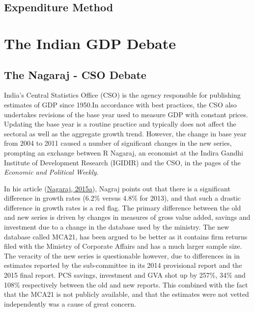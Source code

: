 \documentclass[12pt,nobind, a4paper]{reedthesis}
\begin{document}
 \hypertarget{expenditure-method}{%
 \subsection{Expenditure Method}\label{expenditure-method}}

 \hypertarget{the-indian-gdp-debate}{%
 \section{The Indian GDP Debate}\label{the-indian-gdp-debate}}

 \hypertarget{the-nagaraj---cso-debate}{%
 \subsection{The Nagaraj - CSO Debate}\label{the-nagaraj---cso-debate}}

 India's Central Statistics Office (CSO) is the agency responsible for publishing estimates of GDP since 1950.In accordance with best practices, the CSO also undertakes revisions of the base year used to measure GDP with constant prices. Updating the base year is a routine practice and typically does not affect the sectoral as well as the aggregate growth trend. However, the change in base year from 2004 to 2011 caused a number of significant changes in the new series, prompting an exchange between R Nagaraj, an economist at the Indira Gandhi Institute of Development Research (IGIDIR) and the CSO, in the pages of the \emph{Economic and Political Weekly}.
 \linebreak

 In his article (\protect\hyperlink{ref-nagaraj_seeds_2015-1}{Nagaraj, 2015a}), Nagraj points out that there is a significant difference in growth rates (6.2\% versus 4.8\% for 2013), and that such a drastic difference in growth rates is a red flag. The primary difference between the old and new series is driven by changes in measures of gross value added, savings and investment due to a change in the database used by the ministry. The new database called MCA21, has been argued to be better as it contains firm returns filed with the Ministry of Corporate Affairs and has a much larger sample size. The veracity of the new series is questionable however, due to differences in in estimates reported by the sub-committee in its 2014 provisional report and the 2015 final report. PCS savings, investment and GVA shot up by 257\%, 34\% and 108\% respectively between the old and new reports. This combined with the fact that the MCA21 is not publicly available, and that the estimates were not vetted independently was a cause of great concern.
 \linebreak
\end{document}
